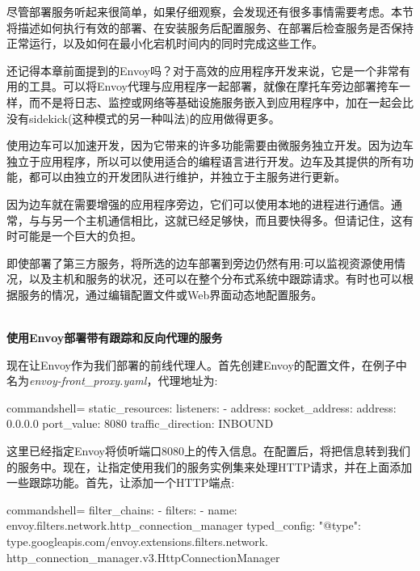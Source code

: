 

尽管部署服务听起来很简单，如果仔细观察，会发现还有很多事情需要考虑。本节将描述如何执行有效的部署、在安装服务后配置服务、在部署后检查服务是否保持正常运行，以及如何在最小化宕机时间内的同时完成这些工作。


还记得本章前面提到的Envoy吗？对于高效的应用程序开发来说，它是一个非常有用的工具。可以将Envoy代理与应用程序一起部署，就像在摩托车旁边部署挎车一样，而不是将日志、监控或网络等基础设施服务嵌入到应用程序中，加在一起会比没有sidekick(这种模式的另一种叫法)的应用做得更多。

使用边车可以加速开发，因为它带来的许多功能需要由微服务独立开发。因为边车独立于应用程序，所以可以使用适合的编程语言进行开发。边车及其提供的所有功能，都可以由独立的开发团队进行维护，并独立于主服务进行更新。

因为边车就在需要增强的应用程序旁边，它们可以使用本地的进程进行通信。通常，与与另一个主机通信相比，这就已经足够快，而且要快得多。但请记住，这有时可能是一个巨大的负担。

即使部署了第三方服务，将所选的边车部署到旁边仍然有用:可以监视资源使用情况，以及主机和服务的状况，还可以在整个分布式系统中跟踪请求。有时也可以根据服务的情况，通过编辑配置文件或Web界面动态地配置服务。

\hspace*{\fill} \\ %
\noindent
\textbf{使用Envoy部署带有跟踪和反向代理的服务}

现在让Envoy作为我们部署的前线代理人。首先创建Envoy的配置文件，在例子中名为\textit{envoy-front\_proxy.yaml}，代理地址为:

\begin{tcblisting}{commandshell={}}
static_resources:
  listeners:
    - address:
      socket_address:
        address: 0.0.0.0
        port_value: 8080
      traffic_direction: INBOUND
\end{tcblisting}

这里已经指定Envoy将侦听端口8080上的传入信息。在配置后，将把信息转到我们的服务中。现在，让指定使用我们的服务实例集来处理HTTP请求，并在上面添加一些跟踪功能。首先，让添加一个HTTP端点:

\begin{tcblisting}{commandshell={}}
filter_chains:
  - filters:
  - name: envoy.filters.network.http_connection_manager
    typed_config:
      "@type":
type.googleapis.com/envoy.extensions.filters.network.
http_connection_manager.v3.HttpConnectionManager
\end{tcblisting}


